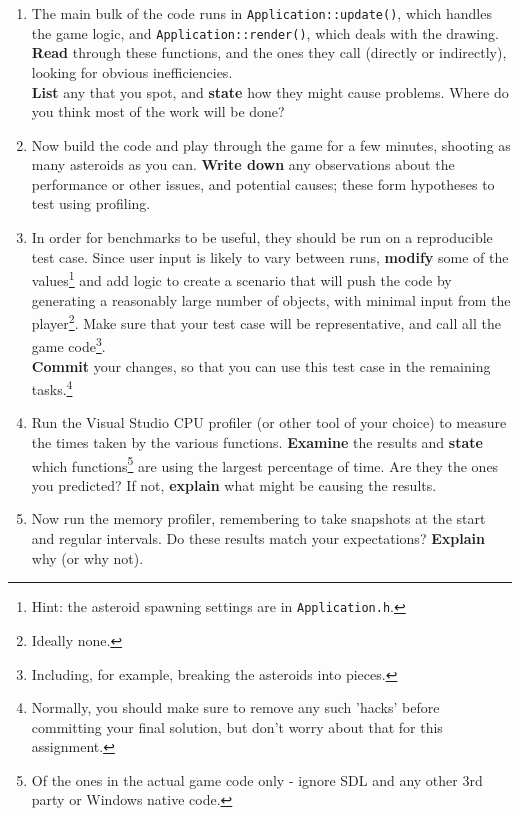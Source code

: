 \documentclass{../../../fal_assignment}
\begin{document}
\begin{enumerate}
	\item The main bulk of the code runs in \lstinline{Application::update()}, which handles the game logic, and \lstinline{Application::render()}, which deals with the drawing. \textbf{Read} through these functions, and the ones they call (directly or indirectly), looking for obvious inefficiencies.\\
\textbf{List} any that you spot, and \textbf{state} how they might cause problems. Where do you think most of the work will be done?\\
	\item Now build the code and play through the game for a few minutes, shooting as many asteroids as you can. \textbf{Write down} any observations about the performance or other issues, and potential causes; these form hypotheses to test using profiling.\\
	\item In order for benchmarks to be useful, they should be run on a reproducible test case. Since user input is likely to vary between runs, \textbf{modify} some of the values\footnote{Hint: the asteroid spawning settings are in \lstinline{Application.h}.} and add logic to create a scenario that will push the code by generating a reasonably large number of objects, with minimal input from the player\footnote{Ideally none.}. Make sure that your test case will be representative, and call all the game code\footnote{Including, for example, breaking the asteroids into pieces.}.\\
\textbf{Commit} your changes, so that you can use this test case in the remaining tasks.\footnote{Normally, you should make sure to remove any such 'hacks' before committing your final solution, but don't worry about that for this assignment.}\\
	\item Run the Visual Studio CPU profiler (or other tool of your choice) to measure the times taken by the various functions. \textbf{Examine} the results and \textbf{state} which functions\footnote{Of the ones in the actual game code only - ignore SDL and any other 3rd party or Windows native code.} are using the largest percentage of time. Are they the ones you predicted? If not, \textbf{explain} what might be causing the results.\\
	\item Now run the memory profiler, remembering to take snapshots at the start and regular intervals. Do these results match your expectations? \textbf{Explain} why (or why not).
\end{enumerate}
\end{document}
